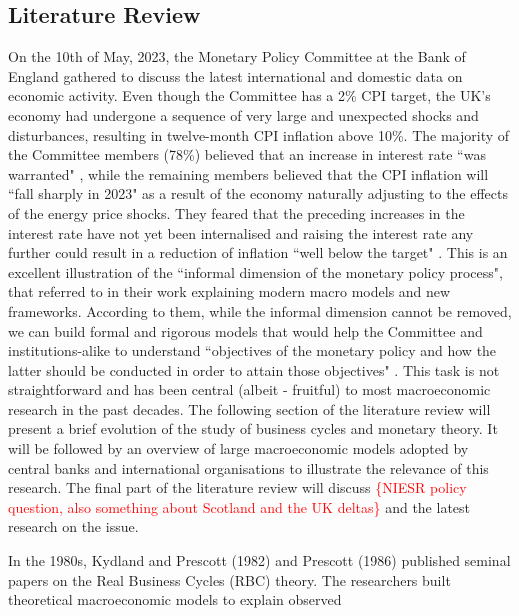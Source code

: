 \subsection{Literature Review}
On the 10th of May, 2023, the Monetary Policy Committee at the Bank of England gathered to discuss the latest international and domestic data on economic activity. Even though the Committee has a 2\% CPI target, the UK's economy had undergone a sequence of very large and unexpected shocks and disturbances, resulting in twelve-month CPI inflation above 10\%. The majority of the Committee members (78\%) believed that an increase in interest rate ``was warranted" \parencite[4]{boe_2023_monetary}, while the remaining members believed that the CPI inflation will ``fall sharply in 2023" \parencite[5]{boe_2023_monetary} as a result of the economy naturally adjusting to the effects of the energy price shocks. They feared that the preceding increases in the interest rate have not yet been internalised and raising the interest rate any further could result in a reduction of inflation ``well below the target" \parencite[5]{boe_2023_monetary}. This is an excellent illustration of the ``informal dimension of the monetary policy process", that \parencite[26]{gals_2007_macroeconomic} referred to in their work explaining modern macro models and new frameworks. According to them, while the informal dimension cannot be removed, we can build formal and rigorous models that would help the Committee and institutions-alike to understand ``objectives of the monetary policy and how the latter should be conducted in order to attain those objectives" \parencite[2]{jordigal_2015_monetary}. This task is not straightforward and has been central (albeit - fruitful) to most macroeconomic research in the past decades. The following section of the literature review will present a brief evolution of the study of business cycles and monetary theory. It will be followed by an overview of large macroeconomic models adopted by central banks and international organisations to illustrate the relevance of this research. The final part of the literature review will discuss \textcolor{red}{\{NIESR policy question, also something about Scotland and the UK deltas\}} and the latest research on the issue.

In the 1980s, Kydland and Prescott (1982) and Prescott (1986) published seminal papers on the Real Business Cycles (RBC) theory. The researchers built theoretical macroeconomic models to explain observed 